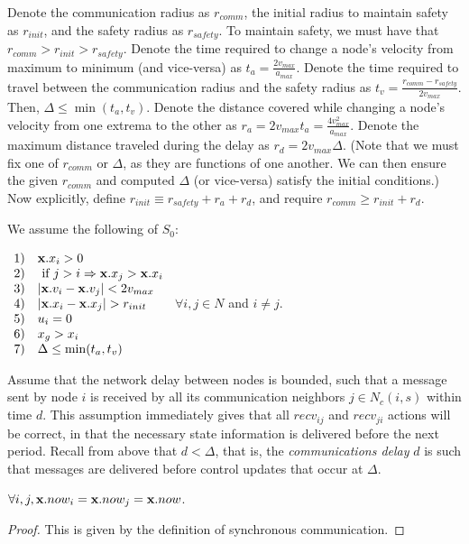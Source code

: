 \documentclass[10pt, conference, compsocconf]{IEEEtran}
\begin{document}
Denote the communication radius as $r_{comm}$, the initial radius to maintain safety as $r_{init}$, and the safety radius as $\mathit{r_{safety}}$.  To maintain safety, we must have that $r_{comm} > r_{init} > \mathit{r_{safety}}$.
%
Denote the time required to change a node's velocity from maximum to minimum (and vice-versa) as $t_a = \frac{2v_{max}}{a_{max}}$.  Denote the time required to travel between the communication radius and the safety radius as $t_v = \frac{r_{comm} - \mathit{r_{safety}}}{2v_{max}}$.  Then, $\Delta \leq \min(t_a, t_v)$.
%
Denote the distance covered while changing a node's velocity from one extrema to the other as $r_a = 2v_{max}t_a = \frac{4v_{max}^2}{a_{max}}$.  Denote the maximum distance traveled during the delay as $r_d = 2v_{max}\Delta$.
%
(Note that we must fix one of $r_{comm}$ or $\Delta$, as they are functions of one another.  We can then ensure the given $r_{comm}$ and computed $\Delta$ (or vice-versa) satisfy the initial conditions.)
%
Now explicitly, define $r_{init} \equiv \mathit{r_{safety}} + r_a + r_d$, and require $r_{comm} \geq r_{init} + r_d$.

We assume the following of $S_0$:

$ \begin{array}{ll}
		1) & {\bf x}.x_i > 0 \\
		2) & \textrm{ if } j > i \Rightarrow {\bf x}.x_j > {\bf x}.x_i \\
		3) & \lvert{\bf x}.v_i - {\bf x}.v_{j}\rvert < 2v_{max} \\
		4) & \lvert{\bf x}.x_i - {\bf x}.x_{j}\rvert > r_{init} \\
		5) & u_i = 0 \\
		6) & x_g > x_i \\
		7) & \Delta \leq \min(t_a, t_v)
	\end{array} $
$\forall i, j \in N$ and $i \neq j$.

Assume that the network delay between nodes is bounded, such that a message sent by node $i$ is received by all its communication neighbors $j \in N_c(i, s)$ within time $d$.  This assumption immediately gives that all $recv_{ij}$ and $recv_{ji}$ actions will be correct, in that the necessary state information is delivered before the next period.  Recall from above that $d < \Delta$, that is, the \textit{communications delay} $d$ is such that messages are delivered before control updates that occur at $\Delta$.

\begin{inv}
\label{inv:now}
$\forall i, j, {\bf x}.now_i = {\bf x}.now_j = {\bf x}.now$.
\end{inv}
\begin{proof}
This is given by the definition of synchronous communication.
\end{proof}
\end{document}
